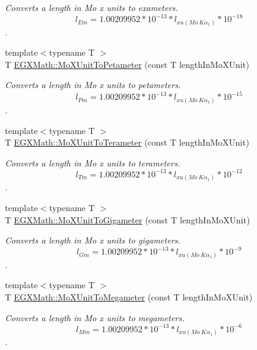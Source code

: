 \begin{DoxyCompactItemize}
\begin{DoxyCompactList}\small\item\em Converts a length in Mo x units to exameters. \[ l_{Em}=1.00209952*10^{-13} * l_{xu(Mo\ K\alpha_1)} * 10^{-18} \]. \end{DoxyCompactList}\item 
{\footnotesize template$<$typename T $>$ }\\T \mbox{\hyperlink{group___e_g_x_math-_conversions-_length_conversions-_non-_s_i-_mo_x_unit-_s_i_gadaa6c90eb9cf739e3bfd9fd66d6a998a}{E\+G\+X\+Math\+::\+Mo\+X\+Unit\+To\+Petameter}} (const T length\+In\+Mo\+X\+Unit)
\begin{DoxyCompactList}\small\item\em Converts a length in Mo x units to petameters. \[ l_{Pm}=1.00209952*10^{-13} * l_{xu(Mo\ K\alpha_1)} * 10^{-15} \]. \end{DoxyCompactList}\item 
{\footnotesize template$<$typename T $>$ }\\T \mbox{\hyperlink{group___e_g_x_math-_conversions-_length_conversions-_non-_s_i-_mo_x_unit-_s_i_ga8f6e4c8426fae89833534d8aac0b69c7}{E\+G\+X\+Math\+::\+Mo\+X\+Unit\+To\+Terameter}} (const T length\+In\+Mo\+X\+Unit)
\begin{DoxyCompactList}\small\item\em Converts a length in Mo x units to terameters. \[ l_{Tm}=1.00209952*10^{-13} * l_{xu(Mo\ K\alpha_1)} * 10^{-12} \]. \end{DoxyCompactList}\item 
{\footnotesize template$<$typename T $>$ }\\T \mbox{\hyperlink{group___e_g_x_math-_conversions-_length_conversions-_non-_s_i-_mo_x_unit-_s_i_gacb9954e25799b5b7963fd492ceae5363}{E\+G\+X\+Math\+::\+Mo\+X\+Unit\+To\+Gigameter}} (const T length\+In\+Mo\+X\+Unit)
\begin{DoxyCompactList}\small\item\em Converts a length in Mo x units to gigameters. \[ l_{Gm}=1.00209952*10^{-13} * l_{xu(Mo\ K\alpha_1)} * 10^{-9} \]. \end{DoxyCompactList}\item 
{\footnotesize template$<$typename T $>$ }\\T \mbox{\hyperlink{group___e_g_x_math-_conversions-_length_conversions-_non-_s_i-_mo_x_unit-_s_i_ga97f86b6fb3faf5d48cacf99d7aa309d4}{E\+G\+X\+Math\+::\+Mo\+X\+Unit\+To\+Megameter}} (const T length\+In\+Mo\+X\+Unit)
\begin{DoxyCompactList}\small\item\em Converts a length in Mo x units to megameters. \[ l_{Mm}=1.00209952*10^{-13} * l_{xu(Mo\ K\alpha_1)} * 10^{-6} \]. \end{DoxyCompactList}\item 

\end{DoxyCompactItemize}
